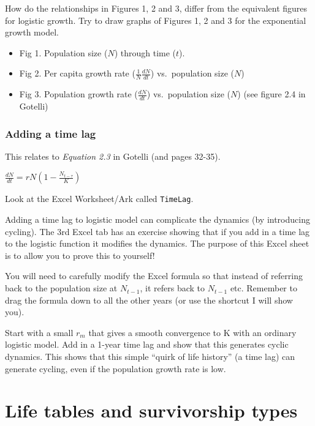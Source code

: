 \documentclass[
  a4paper]{book}
\providecommand{\tightlist}{%
  \setlength{\itemsep}{0pt}\setlength{\parskip}{0pt}}
\begin{document}
How do the relationships in Figures 1, 2 and 3, differ from the equivalent figures for logistic growth. Try to draw graphs of Figures 1, 2 and 3 for the exponential growth model.

\begin{itemize}
\tightlist
\item
  Fig 1. Population size (\(N\)) through time (\(t\)).
\item
  Fig 2. Per capita growth rate (\(\frac{1}{N} \frac{dN}{dt}\)) vs.~population size (\(N\))
\item
  Fig 3. Population growth rate (\(\frac{dN}{dt}\)) vs.~population size (\(N\)) (see figure 2.4 in Gotelli)
\end{itemize}

\hypertarget{adding-a-time-lag}{%
\subsection{Adding a time lag}\label{adding-a-time-lag}}

This relates to \emph{Equation 2.3} in Gotelli (and pages 32-35).

\(\frac{d N}{d t}=r N\left(1-\frac{N_{t-\tau}}{K}\right)\)

Look at the Excel Worksheet/Ark called \texttt{TimeLag}.

Adding a time lag to logistic model can complicate the dynamics (by introducing cycling). The 3rd Excel tab has an exercise showing that if you add in a time lag to the logistic function it modifies the dynamics. The purpose of this Excel sheet is to allow you to prove this to yourself!

You will need to carefully modify the Excel formula so that instead of referring back to the population size at \(N_{t-1}\), it refers back to \(N_{t-1}\) etc. Remember to drag the formula down to all the other years (or use the shortcut I will show you).

Start with a small \(r_m\) that gives a smooth convergence to K with an ordinary logistic model. Add in a 1-year time lag and show that this generates cyclic dynamics. This shows that this simple ``quirk of life history'' (a time lag) can generate cycling, even if the population growth rate is low.

\hypertarget{life-tables-and-survivorship-types}{%
\chapter{Life tables and survivorship types}\label{life-tables-and-survivorship-types}}
\end{document}
